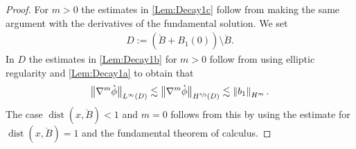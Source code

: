 \documentclass[JEP,XML,SOM,Unicode,published]{cedram}
\let\backslash\setminus
\theoremstyle{definition}
\DeclareMathOperator{\dist}{dist}
\newcommand\norm[1]{\left\lVert #1\right\rVert}
\newcommand\bnorm[1]{\bigl\lVert #1\bigr\rVert}
\begin{document}
\begin{proof}
For $m>0$ the estimates in \eqref{Lem:Decay1c} follow from making the same argument with the derivatives of the fundamental solution. We set
\begin{align}\label{DefinitionD}
D:=(\grave{B}+B_1(0))\backslash \grave{B}.
\end{align}
In $D$ the estimates in \eqref{Lem:Decay1b} for $m>0$ follow from using elliptic regularity and \eqref{Lem:Decay1a} to obtain that
\begin{align*}
\bnorm{\nabla^m\grave{\phi}}_{L^\infty(D)}\lesssim \bnorm{\nabla^m\grave{\phi}}_{H^{\sfrac{4}{3}}(D)}\lesssim \norm{b_1}_{H^{m}}.
\end{align*}
The case $\dist(x,\grave{B})<1$ and $m=0$ follows from this by using the estimate for $\dist(x,\grave{B})=1$ and the fundamental theorem of calculus.
\end{proof}
\end{document}
